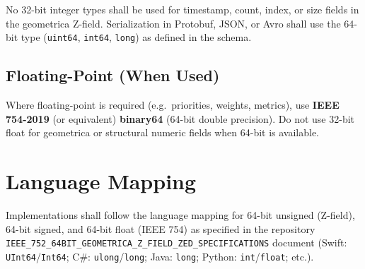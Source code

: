 No 32-bit integer types shall be used for timestamp, count, index, or size fields in the geometrica Z-field. Serialization in Protobuf, JSON, or Avro shall use the 64-bit type (\texttt{uint64}, \texttt{int64}, \texttt{long}) as defined in the schema.

\subsection{Floating-Point (When Used)}

Where floating-point is required (e.g.\ priorities, weights, metrics), use \textbf{IEEE 754-2019} (or equivalent) \textbf{binary64} (64-bit double precision). Do not use 32-bit float for geometrica or structural numeric fields when 64-bit is available.

\section{Language Mapping}

Implementations shall follow the language mapping for 64-bit unsigned (Z-field), 64-bit signed, and 64-bit float (IEEE 754) as specified in the repository \texttt{IEEE\_752\_64BIT\_GEOMETRICA\_Z\_FIELD\_ZED\_SPECIFICATIONS} document (Swift: \texttt{UInt64}/\texttt{Int64}; C\#: \texttt{ulong}/\texttt{long}; Java: \texttt{long}; Python: \texttt{int}/\texttt{float}; etc.).
